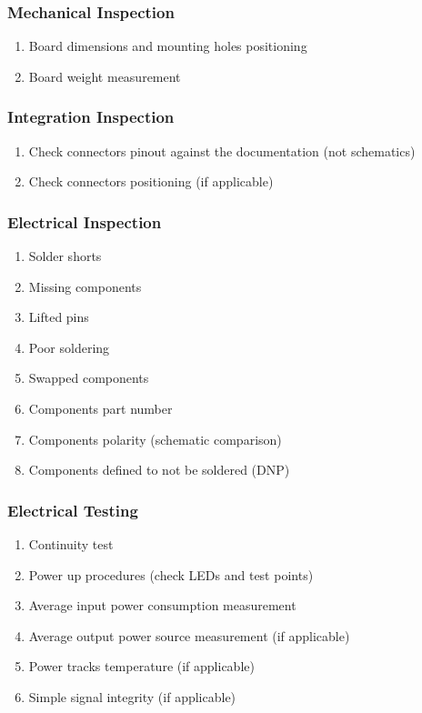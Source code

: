 \subsubsection{Mechanical Inspection}

\begin{enumerate} \setlength\itemsep{-0.3em}
    \item Board dimensions and mounting holes positioning
    \item Board weight measurement
\end{enumerate}

\subsubsection{Integration Inspection}

\begin{enumerate} \setlength\itemsep{-0.3em}
    \item Check connectors pinout against the documentation (not schematics)
    \item Check connectors positioning (if applicable)
\end{enumerate}

\subsubsection{Electrical Inspection}

\begin{enumerate} \setlength\itemsep{-0.3em}
    \item Solder shorts
    \item Missing components
    \item Lifted pins
    \item Poor soldering
    \item Swapped components
    \item Components part number
    \item Components polarity (schematic comparison)
    \item Components defined to not be soldered (DNP)
\end{enumerate}

\subsubsection{Electrical Testing}

\begin{enumerate} \setlength\itemsep{-0.3em}
    \item Continuity test
    \item Power up procedures (check LEDs and test points)
    \item Average input power consumption measurement
    \item Average output power source measurement (if applicable) 
    \item Power tracks temperature (if applicable)
    \item Simple signal integrity (if applicable)
\end{enumerate}

